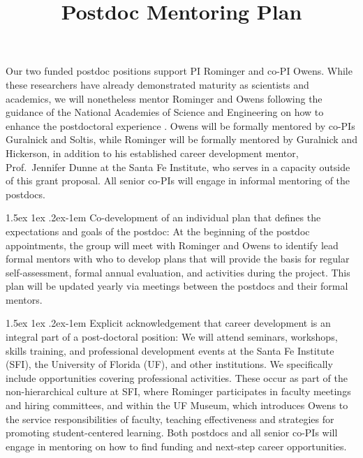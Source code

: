 \documentclass[11pt]{article}
\title{Postdoc Mentoring Plan \vspace{-1.5ex}}
\author{}
\date{}
\makeatletter
\renewcommand{\paragraph}{\@startsection{paragraph}{4}{\z@}
  {1.5ex \@plus 1ex \@minus .2ex}{-1em}
  {\normalfont\normalsize\it}
}
\makeatother
\begin{document}
\maketitle
\thispagestyle{fancy} 
\vspace{-6em}


Our two funded postdoc positions support PI Rominger and co-PI Owens.
While these researchers have already demonstrated maturity as scientists
and academics, we will nonetheless mentor Rominger and Owens following
the guidance of the National Academies of Science and Engineering on how
to enhance the postdoctoral experience \citep{NASpostdoc}.
Owens will be formally mentored by co-PIs Guralnick and Soltis, while
Rominger will be formally mentored by Guralnick and Hickerson, in
addition to his established career development mentor, Prof.~Jennifer
Dunne at the Santa Fe Institute, who serves in a capacity outside of
this grant proposal. All senior co-PIs will engage in informal mentoring
of the postdocs.

\paragraph{Co-development of an individual plan that defines the expectations
and goals of the postdoc:} At the beginning of the postdoc appointments,
the group will meet with Rominger and Owens to identify lead formal
mentors with who to develop plans that will provide the basis for
regular self-assessment, formal annual evaluation, and activities during
the project. This plan will be updated yearly via meetings between the
postdocs and their formal mentors.

\paragraph{Explicit acknowledgement that career development is an
  integral part of a post-doctoral position:} We will attend seminars,
workshops, skills training, and professional development events at the
Santa Fe Institute (SFI), the University of Florida (UF), and other
institutions. We specifically include opportunities covering
professional activities.  These occur as part of the non-hierarchical
culture at SFI, where Rominger participates in faculty meetings and
hiring committees, and within the UF Museum, which introduces Owens to
the service responsibilities of faculty, teaching effectiveness and
strategies for promoting student-centered learning. Both postdocs and
all senior co-PIs will engage in mentoring on how to find funding and
next-step career opportunities.
\end{document}

